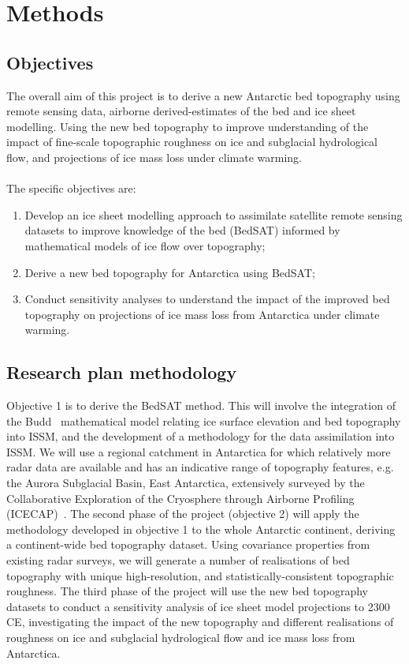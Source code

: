\chapter{Methods}
\section*{Objectives}

The overall aim of this project is to derive a new Antarctic bed topography using remote sensing data, airborne derived-estimates of the bed and ice sheet modelling. Using the new bed topography to improve understanding of the impact of fine-scale topographic roughness on ice and subglacial hydrological flow, and projections of ice mass loss under climate warming.\\
\\The specific objectives are:
\begin{enumerate}
    \item Develop an ice sheet modelling approach to assimilate satellite remote sensing datasets to improve knowledge of the bed (BedSAT) informed by mathematical models of ice flow over topography;
    \item Derive a new bed topography for Antarctica using BedSAT;
    \item Conduct sensitivity analyses to understand the impact of the improved bed topography on projections of ice mass loss from Antarctica under climate warming.
\end{enumerate}

\section*{Research plan methodology}

Objective 1 is to derive the BedSAT method. This will involve the integration of the Budd~\cite{Budd_1970} mathematical model relating ice surface elevation and bed topography into ISSM, and the development of a methodology for the data assimilation into ISSM. We will use a regional catchment in Antarctica for which relatively more radar data are available and has an indicative range of topography features, e.g. the Aurora Subglacial Basin, East Antarctica, extensively surveyed by the Collaborative Exploration of the Cryosphere through Airborne Profiling (ICECAP)~\cite{Young_2011}. The second phase of the project (objective 2) will apply the methodology developed in objective 1 to the whole Antarctic continent, deriving a continent-wide bed topography dataset. Using covariance properties from existing radar surveys, we will generate a number of realisations of bed topography with unique high-resolution, and statistically-consistent topographic roughness. The third phase of the project will use the new bed topography datasets to conduct a sensitivity analysis of ice sheet model projections to 2300 CE, investigating the impact of the new topography and different realisations of roughness on ice and subglacial hydrological flow and ice mass loss from Antarctica.\\
\newpage
